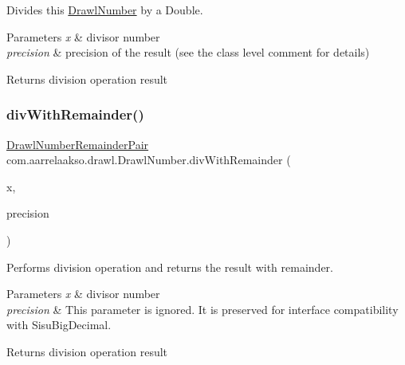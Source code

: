 Divides this \hyperlink{classcom_1_1aarrelaakso_1_1drawl_1_1_drawl_number}{Drawl\+Number} by a Double. 


\begin{DoxyParams}{Parameters}
{\em x} & divisor number \\
\hline
{\em precision} & precision of the result (see the class level comment for details) \\
\hline
\end{DoxyParams}
\begin{DoxyReturn}{Returns}
division operation result 
\end{DoxyReturn}
\mbox{\label{classcom_1_1aarrelaakso_1_1drawl_1_1_drawl_number_ab25fcdd87cf4bf6bc5906526940b4ac3}} 
\subsubsection{\texorpdfstring{div\+With\+Remainder()}{divWithRemainder()}\hspace{0.1cm}{\footnotesize\ttfamily [1/2]}}
{\footnotesize\ttfamily \hyperlink{classcom_1_1aarrelaakso_1_1drawl_1_1_drawl_number_remainder_pair}{Drawl\+Number\+Remainder\+Pair} com.\+aarrelaakso.\+drawl.\+Drawl\+Number.\+div\+With\+Remainder (\begin{DoxyParamCaption}\item[{\hyperlink{classcom_1_1aarrelaakso_1_1drawl_1_1_drawl_number}{Drawl\+Number}}]{x,  }\item[{int}]{precision }\end{DoxyParamCaption})\hspace{0.3cm}{\ttfamily [protected]}}



Performs division operation and returns the result with remainder. 


\begin{DoxyParams}{Parameters}
{\em x} & divisor number \\
\hline
{\em precision} & This parameter is ignored. It is preserved for interface compatibility with Sisu\+Big\+Decimal. \\
\hline
\end{DoxyParams}
\begin{DoxyReturn}{Returns}
division operation result 
\end{DoxyReturn}
\mbox{\label{classcom_1_1aarrelaakso_1_1drawl_1_1_drawl_number_a99090eea8ac1be98cf40ef75f8eed090}} 

